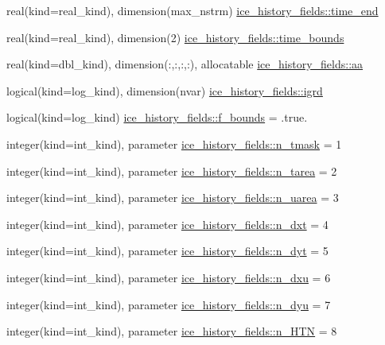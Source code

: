 \begin{DoxyCompactItemize}
\item 
real(kind=real\_\-kind), dimension(max\_\-nstrm) \hyperlink{namespaceice__history__fields_aaead8298e219c1e1308f21fc20ee5acd}{ice\_\-history\_\-fields::time\_\-end}
\item 
real(kind=real\_\-kind), dimension(2) \hyperlink{namespaceice__history__fields_af1a62dc90d229ad2a1f46e618e3903d3}{ice\_\-history\_\-fields::time\_\-bounds}
\item 
real(kind=dbl\_\-kind), dimension(:,:,:,:), allocatable \hyperlink{namespaceice__history__fields_af5f594399a95ba6eccac351207392285}{ice\_\-history\_\-fields::aa}
\item 
logical(kind=log\_\-kind), dimension(nvar) \hyperlink{namespaceice__history__fields_a7efcc39b544df18b2e0d1952257eb758}{ice\_\-history\_\-fields::igrd}
\item 
logical(kind=log\_\-kind) \hyperlink{namespaceice__history__fields_a2f3cd20e9232a9ef13482e90435469dc}{ice\_\-history\_\-fields::f\_\-bounds} = .true.
\item 
integer(kind=int\_\-kind), parameter \hyperlink{namespaceice__history__fields_a357c5d0fb7837fb0461704f23f46d101}{ice\_\-history\_\-fields::n\_\-tmask} = 1
\item 
integer(kind=int\_\-kind), parameter \hyperlink{namespaceice__history__fields_aede613891c36b6de42a6b5dfa94a6c47}{ice\_\-history\_\-fields::n\_\-tarea} = 2
\item 
integer(kind=int\_\-kind), parameter \hyperlink{namespaceice__history__fields_a40dda082d8b468c6159dfd8d7fe5763d}{ice\_\-history\_\-fields::n\_\-uarea} = 3
\item 
integer(kind=int\_\-kind), parameter \hyperlink{namespaceice__history__fields_a613db804c0915e1be10166a897ae5620}{ice\_\-history\_\-fields::n\_\-dxt} = 4
\item 
integer(kind=int\_\-kind), parameter \hyperlink{namespaceice__history__fields_a7489b539895f4c90f2ac32cef942834d}{ice\_\-history\_\-fields::n\_\-dyt} = 5
\item 
integer(kind=int\_\-kind), parameter \hyperlink{namespaceice__history__fields_abf7b5bd4ffe0fce783bbb9305b92e08c}{ice\_\-history\_\-fields::n\_\-dxu} = 6
\item 
integer(kind=int\_\-kind), parameter \hyperlink{namespaceice__history__fields_ae9ef4bdaa9a78373d8e7a64434e63832}{ice\_\-history\_\-fields::n\_\-dyu} = 7
\item 
integer(kind=int\_\-kind), parameter \hyperlink{namespaceice__history__fields_a2fd568cf96c89f8164ffb0a11143bdbe}{ice\_\-history\_\-fields::n\_\-HTN} = 8

\end{DoxyCompactItemize}
